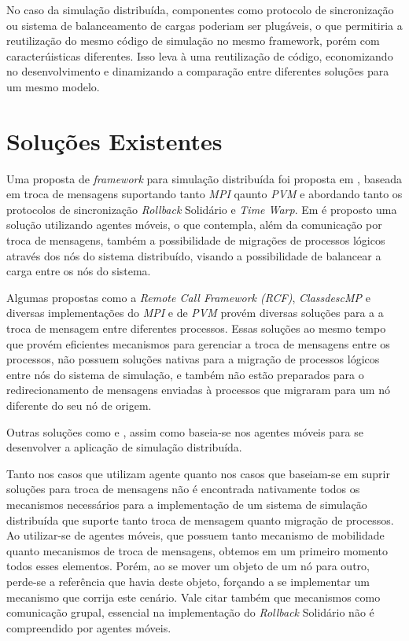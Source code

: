 No caso da simulação distribuída, componentes como protocolo de sincronização ou sistema de balanceamento de cargas poderiam ser plugáveis, o que permitiria a reutilização do mesmo código de simulação no mesmo framework, porém com caracterúisticas diferentes. Isso leva à uma reutilização de código, economizando no desenvolvimento e dinamizando a comparação entre diferentes soluções para um mesmo modelo.

\section{Soluções Existentes \label{solucoes_existentes}}

Uma proposta de \textit{framework} para simulação distribuída foi proposta em \cite{LIVERSON}, baseada em troca de mensagens suportando tanto \textit{MPI} qaunto \textit{PVM} e abordando tanto os protocolos de sincronização \textit{Rollback} Solidário e \textit{Time Warp}. Em \cite{RIBEIROALVES} é proposto uma solução utilizando agentes móveis, o que contempla, além da comunicação por troca de mensagens, também a possibilidade de migrações de processos lógicos através dos nós do sistema distribuído, visando a possibilidade de balancear a carga entre os nós do sistema.

Algumas propostas como a \textit{Remote Call Framework (RCF)}, \textit{ClassdescMP} e diversas implementações do \textit{MPI} e de \textit{PVM} provém diversas soluções para a a troca de mensagem entre diferentes processos. Essas soluções ao mesmo tempo que provém eficientes mecanismos para gerenciar a troca de mensagens entre os processos, não possuem soluções nativas para a migração de processos lógicos entre nós do sistema de simulação, e também não estão preparados para o redirecionamento de mensagens enviadas à processos que migraram para um nó diferente do seu nó de origem.

Outras soluções como \cite{SASSY} e \cite{}, assim como \cite{RIBEIROALVES} baseia-se nos agentes móveis para se desenvolver a aplicação de simulação distribuída.

Tanto nos casos que utilizam agente quanto nos casos que baseiam-se em suprir soluções para troca de mensagens não é encontrada nativamente todos os mecanismos necessários para a implementação de um sistema de simulação distribuída que suporte tanto troca de mensagem quanto migração de processos. Ao utilizar-se de agentes móveis, que possuem tanto mecanismo de mobilidade quanto mecanismos de troca de mensagens, obtemos em um primeiro momento todos esses elementos. Porém, ao se mover um objeto de um nó para outro, perde-se a referência que havia deste objeto, forçando a se implementar um mecanismo que corrija este cenário. Vale citar também que mecanismos como comunicação grupal, essencial na implementação do \textit{Rollback} Solidário não é compreendido por agentes móveis.

